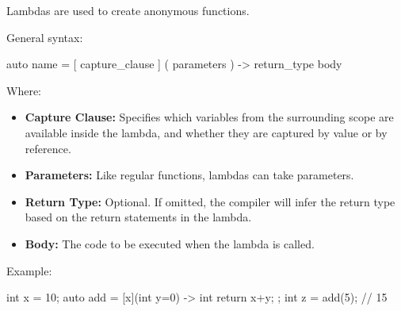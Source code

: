 \documentclass{report}
\begin{document}
    \pagebreak
    \bigbreak \noindent 
    \begin{concept}
       Lambdas are used to create anonymous functions. 
    \end{concept}
    \bigbreak \noindent 
    General syntax:
    \bigbreak \noindent 
    \begin{cppcode}
auto name = [ capture_clause ] ( parameters ) -> return_type { body }
    \end{cppcode}
    \bigbreak \noindent 
    Where:
    \begin{itemize}
        \item \textbf{Capture Clause:} Specifies which variables from the surrounding scope are available inside the lambda, and whether they are captured by value or by reference.
        \item \textbf{Parameters:} Like regular functions, lambdas can take parameters.
        \item \textbf{Return Type:} Optional. If omitted, the compiler will infer the return type based on the return statements in the lambda.
        \item \textbf{Body:} The code to be executed when the lambda is called.
    \end{itemize}

    \bigbreak \noindent 
    Example:
    \bigbreak \noindent 
    \begin{cppcode}
int x = 10;
auto add = [x](int y=0) -> int { return x+y; };
int z  = add(5);  // 15
    \end{cppcode}
    \bigbreak \noindent 
\end{document}

